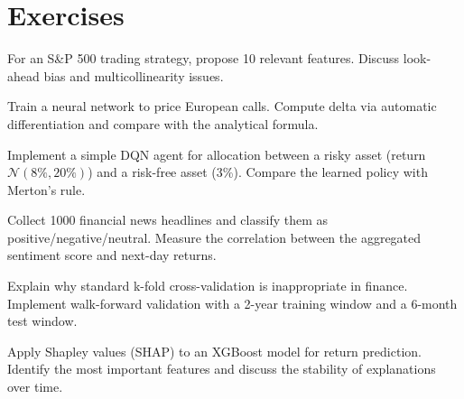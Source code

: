 \section{Exercises}

\begin{exercise}
For an S\&P 500 trading strategy, propose 10 relevant features. Discuss
look-ahead bias and multicollinearity issues.
\end{exercise}

\begin{exercise}
Train a neural network to price European calls. Compute delta via automatic
differentiation and compare with the analytical formula.
\end{exercise}

\begin{exercise}
Implement a simple DQN agent for allocation between a risky asset (return
$\mathcal{N}(8\%, 20\%)$) and a risk-free asset (3\%). Compare the learned
policy with Merton's rule.
\end{exercise}

\begin{exercise}
Collect 1000 financial news headlines and classify them as
positive/negative/neutral. Measure the correlation between the aggregated
sentiment score and next-day returns.
\end{exercise}

\begin{exercise}
Explain why standard k-fold cross-validation is inappropriate in finance.
Implement walk-forward validation with a 2-year training window and a 6-month
test window.
\end{exercise}

\begin{exercise}[Interpretability]
Apply Shapley values (SHAP) to an XGBoost model for return prediction.
Identify the most important features and discuss the stability of
explanations over time.
\end{exercise}
